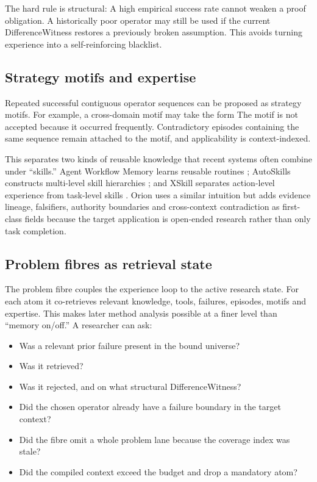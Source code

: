 The hard rule is structural:
A high empirical success rate cannot weaken a proof obligation. A historically poor operator may still be used if the current DifferenceWitness restores a previously broken assumption. This avoids turning experience into a self-reinforcing blacklist.

\subsection{Strategy motifs and expertise}

Repeated successful contiguous operator sequences can be proposed as strategy motifs. For example, a cross-domain motif may take the form
The motif is not accepted because it occurred frequently. Contradictory episodes containing the same sequence remain attached to the motif, and applicability is context-indexed.

This separates two kinds of reusable knowledge that recent systems often combine under ``skills.'' Agent Workflow Memory learns reusable routines \cite{wang2024awm}; AutoSkills constructs multi-level skill hierarchies \cite{wang2026autoskills}; and XSkill separates action-level experience from task-level skills \cite{jiang2026xskill}. Orion uses a similar intuition but adds evidence lineage, falsifiers, authority boundaries and cross-context contradiction as first-class fields because the target application is open-ended research rather than only task completion.

\subsection{Problem fibres as retrieval state}

The problem fibre couples the experience loop to the active research state. For each atom it co-retrieves relevant knowledge, tools, failures, episodes, motifs and expertise. This makes later method analysis possible at a finer level than ``memory on/off.'' A researcher can ask:

\begin{itemize}[leftmargin=*]
\item Was a relevant prior failure present in the bound universe?
\item Was it retrieved?
\item Was it rejected, and on what structural DifferenceWitness?
\item Did the chosen operator already have a failure boundary in the target context?
\item Did the fibre omit a whole problem lane because the coverage index was stale?
\item Did the compiled context exceed the budget and drop a mandatory atom?
\end{itemize}

